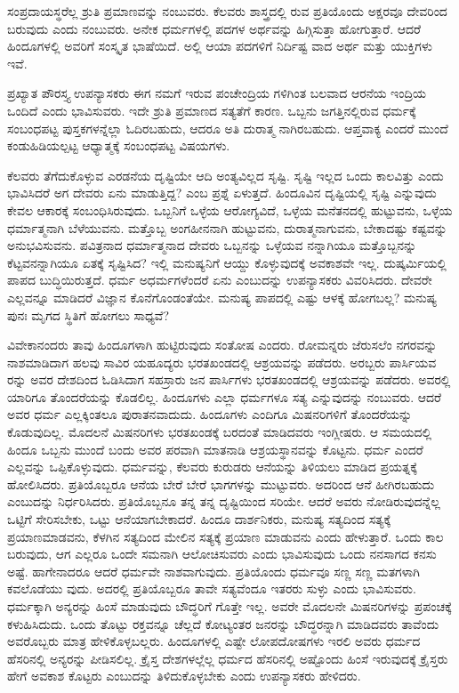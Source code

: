 ಸಂಪ್ರದಾಯಸ್ಥರೆಲ್ಲ ಶ್ರುತಿ ಪ್ರಮಾಣವನ್ನು ನಂಬುವರು. ಕೆಲವರು ಶಾಸ್ತ್ರದಲ್ಲಿ ರುವ ಪ್ರತಿಯೊಂದು ಅಕ್ಷರವೂ ದೇವರಿಂದ ಬರುವುದು ಎಂದು ನಂಬುವರು. ಅನೇಕ ಧರ್ಮಗಳಲ್ಲಿ ಪದಗಳ ಅರ್ಥವನ್ನು ಹಿಗ್ಗಿಸುತ್ತಾ ಹೋಗುತ್ತಾರೆ. ಆದರೆ ಹಿಂದೂಗಳಲ್ಲಿ ಅವರಿಗೆ ಸಂಸ್ಕೃತ ಭಾಷೆಯಿದೆ. ಅಲ್ಲಿ ಆಯಾ ಪದಗಳಿಗೆ ನಿರ್ದಿಷ್ಟ ವಾದ ಅರ್ಥ ಮತ್ತು ಯುಕ್ತಿಗಳು ಇವೆ.

ಪ್ರಖ್ಯಾತ ಪೌರಸ್ತ್ಯ ಉಪನ್ಯಾಸಕರು ಈಗ ನಮಗೆ ಇರುವ ಪಂಚೇಂದ್ರಿಯ ಗಳಿಗಿಂತ ಬಲವಾದ ಆರನೆಯ ಇಂದ್ರಿಯ ಒಂದಿದೆ ಎಂದು ಭಾವಿಸುವರು. ಇದೇ ಶ್ರುತಿ ಪ್ರಮಾಣದ ಸತ್ಯತೆಗೆ ಕಾರಣ. ಒಬ್ಬನು ಜಗತ್ತಿನಲ್ಲಿರುವ ಧರ್ಮಕ್ಕೆ ಸಂಬಂಧಪಟ್ಟ ಪುಸ್ತಕಗಳನ್ನೆಲ್ಲಾ ಓದಿರಬಹುದು, ಆದರೂ ಅತಿ ದುರಾತ್ಮ ನಾಗಿರಬಹುದು. ಆಪ್ತವಾಕ್ಯ ಎಂದರೆ ಮುಂದೆ ಕಂಡುಹಿಡಿಯಲ್ಪಟ್ಟ ಆಧ್ಯಾತ್ಮಕ್ಕೆ ಸಂಬಂಧಪಟ್ಟ ವಿಷಯಗಳು.

ಕೆಲವರು ತೆಗೆದುಕೊಳ್ಳುವ ಎರಡನೆಯ ದೃಷ್ಟಿಯೇ ಆದಿ ಅಂತ್ಯವಿಲ್ಲದ ಸೃಷ್ಟಿ. ಸೃಷ್ಟಿ ಇಲ್ಲದ ಒಂದು ಕಾಲವಿತ್ತು ಎಂದು ಭಾವಿಸಿದರೆ ಅಗ ದೇವರು ಏನು ಮಾಡುತ್ತಿದ್ದ? ಎಂಬ ಪ್ರಶ್ನೆ ಏಳುತ್ತದೆ. ಹಿಂದೂವಿನ ದೃಷ್ಟಿಯಲ್ಲಿ ಸೃಷ್ಟಿ ಎನ್ನುವುದು ಕೇವಲ ಆಕಾರಕ್ಕೆ ಸಂಬಂಧಿಸಿರುವುದು. ಒಬ್ಬನಿಗೆ ಒಳ್ಳೆಯ ಆರೋಗ್ಯವಿದೆ, ಒಳ್ಳೆಯ ಮನೆತನದಲ್ಲಿ ಹುಟ್ಟುವನು, ಒಳ್ಳೆಯ ಧರ್ಮಾತ್ಮನಾಗಿ ಬೆಳೆಯುವನು. ಮತ್ತೊಬ್ಬ ಅಂಗಹೀನನಾಗಿ ಹುಟ್ಟುವನು, ದುರಾತ್ಮನಾಗುವನು, ಬೇಕಾದಷ್ಟು ಕಷ್ಟವನ್ನು ಅನುಭವಿಸುವನು. ಪವಿತ್ರನಾದ ಧರ್ಮಾತ್ಮನಾದ ದೇವರು ಒಬ್ಬನನ್ನು ಒಳ್ಳೆಯವ ನನ್ನಾಗಿಯೂ ಮತ್ತೊಬ್ಬನನ್ನು ಕೆಟ್ಟವನನ್ನಾಗಿಯೂ ಏತಕ್ಕೆ ಸೃಷ್ಟಿಸಿದ? ಇಲ್ಲಿ ಮನುಷ್ಯನಿಗೆ ಆಯ್ದು ಕೊಳ್ಳುವುದಕ್ಕೆ ಅವಕಾಶವೇ ಇಲ್ಲ. ದುಷ್ಕರ್ಮಿಯಲ್ಲಿ ಪಾಪದ ಬುದ್ಧಿಯಿರುತ್ತದೆ. ಧರ್ಮ ಅಧರ್ಮಗಳೆಂದರೆ ಏನು ಎಂಬುದನ್ನು ಉಪನ್ಯಾಸಕರು ವಿವರಿಸಿದರು. ದೇವರೇ ಎಲ್ಲವನ್ನೂ ಮಾಡಿದರೆ ವಿಜ್ಞಾನ ಕೊನೆಗೊಂಡಂತೆಯೇ. ಮನುಷ್ಯ ಪಾಪದಲ್ಲಿ ಎಷ್ಟು ಆಳಕ್ಕೆ ಹೋಗಬಲ್ಲ? ಮನುಷ್ಯ ಪುನಃ ಮೃಗದ ಸ್ಥಿತಿಗೆ ಹೋಗಲು ಸಾಧ್ಯವೆ?

ವಿವೇಕಾನಂದರು ತಾವು ಹಿಂದೂಗಳಾಗಿ ಹುಟ್ಟಿರುವುದು ಸಂತೋಷ ಎಂದರು. ರೋಮನ್ನರು ಜೆರುಸಲೆಂ ನಗರವನ್ನು ನಾಶಮಾಡಿದಾಗ ಹಲವು ಸಾವಿರ ಯಹೂದ್ಯರು ಭರತಖಂಡದಲ್ಲಿ ಆಶ್ರಯವನ್ನು ಪಡೆದರು. ಅರಬ್ಬರು ಪಾರ್ಸಿಯವ ರನ್ನು ಅವರ ದೇಶದಿಂದ ಓಡಿಸಿದಾಗ ಸಹಸ್ರಾರು ಜನ ಪಾರ್ಸಿಗಳು ಭರತಖಂಡದಲ್ಲಿ ಆಶ್ರಯವನ್ನು ಪಡೆದರು. ಅವರಲ್ಲಿ ಯಾರಿಗೂ ತೊಂದರೆಯನ್ನು ಕೊಡಲಿಲ್ಲ. ಹಿಂದೂಗಳು ಎಲ್ಲಾ ಧರ್ಮಗಳೂ ಸತ್ಯ ಎನ್ನುವುದನ್ನು ನಂಬುವರು. ಆದರೆ ಅವರ ಧರ್ಮ ಎಲ್ಲಕ್ಕಿಂತಲೂ ಪುರಾತನವಾದುದು. ಹಿಂದೂಗಳು ಎಂದಿಗೂ ಮಿಷನರಿಗಳಿಗೆ ತೊಂದರೆಯನ್ನು ಕೊಡುವುದಿಲ್ಲ. ಮೊದಲನೆ ಮಿಷನರಿಗಳು ಭರತಖಂಡಕ್ಕೆ ಬರದಂತೆ ಮಾಡಿದವರು ಇಂಗ್ಲೀಷರು. ಆ ಸಮಯದಲ್ಲಿ ಹಿಂದೂ ಒಬ್ಬನು ಮುಂದೆ ಬಂದು ಅವರ ಪರವಾಗಿ ಮಾತನಾಡಿ ಆಶ್ರಯಸ್ಥಾನವನ್ನು ಕೊಟ್ಟನು. ಧರ್ಮ ಎಂದರೆ ಎಲ್ಲವನ್ನು ಒಪ್ಪಿಕೊಳ್ಳುವುದು. ಧರ್ಮವನ್ನು, ಕೆಲವರು ಕುರುಡರು ಆನೆಯನ್ನು ತಿಳಿಯಲು ಮಾಡಿದ ಪ್ರಯತ್ನಕ್ಕೆ ಹೋಲಿಸಿದರು. ಪ್ರತಿಯೊಬ್ಬರೂ ಆನೆಯ ಬೇರೆ ಬೇರೆ ಭಾಗಗಳನ್ನು ಮುಟ್ಟುವರು. ಅದರಿಂದ ಆನೆ ಹೀಗಿರಬಹುದು ಎಂಬುದನ್ನು ನಿರ್ಧರಿಸಿದರು. ಪ್ರತಿಯೊಬ್ಬನೂ ತನ್ನ ತನ್ನ ದೃಷ್ಟಿಯಿಂದ ಸರಿಯೇ. ಆದರೆ ಅವರು ನೋಡಿರುವುದನ್ನೆಲ್ಲ ಒಟ್ಟಿಗೆ ಸೇರಿಸಬೇಕು, ಒಟ್ಟು ಆನೆಯಾಗಬೇಕಾದರೆ. ಹಿಂದೂ ದಾರ್ಶನಿಕರು, ಮನುಷ್ಯ ಸತ್ಯದಿಂದ ಸತ್ಯಕ್ಕೆ ಪ್ರಯಾಣಮಾಡವನು, ಕೆಳಗಿನ ಸತ್ಯದಿಂದ ಮೇಲಿನ ಸತ್ಯಕ್ಕೆ ಪ್ರಯಾಣ ಮಾಡುವನು ಎಂದು ಹೇಳುತ್ತಾರೆ. ಒಂದು ಕಾಲ ಬರುವುದು, ಆಗ ಎಲ್ಲರೂ ಒಂದೇ ಸಮನಾಗಿ ಆಲೋಚಿಸುವರು ಎಂದು ಭಾವಿಸುವುದು ಒಂದು ನನಸಾಗದ ಕನಸು ಅಷ್ಟೆ. ಹಾಗೇನಾದರೂ ಆದರೆ ಧರ್ಮವೇ ನಾಶವಾಗುವುದು. ಪ್ರತಿಯೊಂದು ಧರ್ಮವೂ ಸಣ್ಣ ಸಣ್ಣ ಮತಗಳಾಗಿ ಕವಲೊಡೆಯು ವುದು. ಅದರಲ್ಲಿ ಪ್ರತಿಯೊಬ್ಬರೂ ತಾವೇ ಸತ್ಯವೆಂದೂ ಇತರರು ಸುಳ್ಳು ಎಂದು ಭಾವಿಸುವರು. ಧರ್ಮಕ್ಕಾಗಿ ಅನ್ಯರನ್ನು ಹಿಂಸೆ ಮಾಡುವುದು ಬೌದ್ಧರಿಗೆ ಗೊತ್ತೇ ಇಲ್ಲ. ಅವರೇ ಮೊದಲನೇ ಮಿಷನರಿಗಳನ್ನು ಪ್ರಪಂಚಕ್ಕೆ ಕಳುಹಿಸಿದುದು. ಒಂದು ತೊಟ್ಟು ರಕ್ತವನ್ನೂ ಚೆಲ್ಲದೆ ಕೋಟ್ಯಂತರ ಜನರನ್ನು ಬೌದ್ಧರನ್ನಾಗಿ ಮಾಡಿದವರು ತಾವೆಂದು ಅವರೊಬ್ಬರು ಮಾತ್ರ ಹೇಳಿಕೊಳ್ಳಬಲ್ಲರು. ಹಿಂದೂಗಳಲ್ಲಿ ಎಷ್ಟೇ ಲೋಪದೋಷಗಳು ಇರಲಿ ಅವರು ಧರ್ಮದ ಹೆಸರಿನಲ್ಲಿ ಅನ್ಯರನ್ನು ಪೀಡಿಸಲಿಲ್ಲ. ಕ್ರೈಸ್ತ ದೇಶಗಳಲ್ಲೆಲ್ಲ ಧರ್ಮದ ಹೆಸರಿನಲ್ಲಿ ಅಷ್ಟೊಂದು ಹಿಂಸೆ ಇರುವುದಕ್ಕೆ ಕ್ರೈಸ್ತರು ಹೇಗೆ ಅವಕಾಶ ಕೊಟ್ಟರು ಎಂಬುದನ್ನು ತಿಳಿದುಕೊಳ್ಳಬೇಕು ಎಂದು ಉಪನ್ಯಾಸಕರು ಹೇಳಿದರು.

